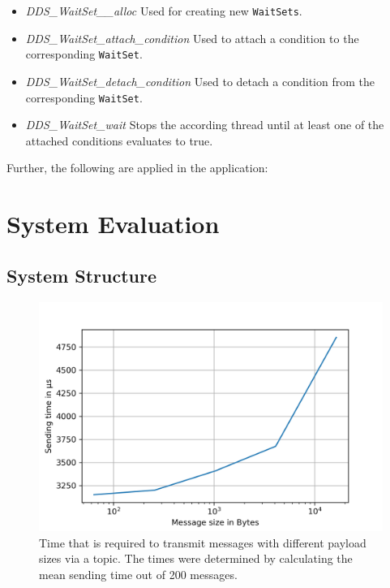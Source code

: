 \begin{itemize}
\item \textit{DDS\_WaitSet\_\_alloc} Used for creating new \texttt{WaitSets}.
\item \textit{DDS\_WaitSet\_attach\_condition} Used to attach a condition to the corresponding \texttt{WaitSet}.
\item \textit{DDS\_WaitSet\_detach\_condition} Used to detach a condition from the corresponding \texttt{WaitSet}.
\item \textit{DDS\_WaitSet\_wait} Stops the according thread until at least one of the attached conditions evaluates to true.
\end{itemize}

Further, the following  are applied in the application:


\section{System Evaluation}

\subsection{System Structure}
\begin{figure}[!hb]
	\centering
	\includegraphics[width=0.75\linewidth]{images/plots/sendingTimes}
	\caption{Time that is required to transmit messages with different payload sizes via a  topic. The times were determined by calculating the mean sending time out of 200 messages.}
	\label{fig:PlotSendingTimes}
\end{figure}

